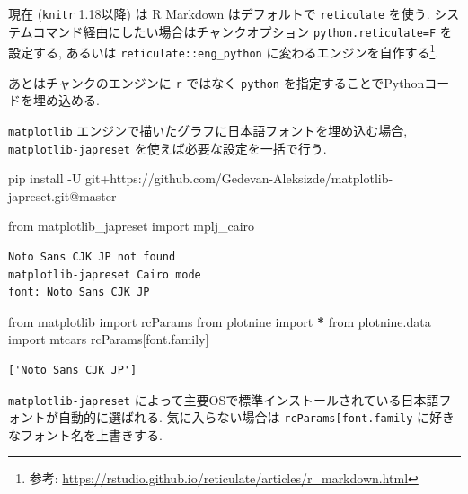 \documentclass[
  xelatex,ja=standard,jafont=noto]{bxjsbook}
\newenvironment{Shaded}{\begin{snugshade}}{\end{snugshade}}
\newcommand{\AttributeTok}[1]{\textcolor[rgb]{0.77,0.63,0.00}{#1}}
\newcommand{\ExtensionTok}[1]{#1}
\newcommand{\ImportTok}[1]{#1}
\newcommand{\NormalTok}[1]{#1}
\newcommand{\OperatorTok}[1]{\textcolor[rgb]{0.81,0.36,0.00}{\textbf{#1}}}
\newcommand{\StringTok}[1]{\textcolor[rgb]{0.31,0.60,0.02}{#1}}
\theoremstyle{definition}
\theoremstyle{definition}
\theoremstyle{definition}
\theoremstyle{definition}
\theoremstyle{remark}
\begin{document}
現在 (\texttt{knitr} 1.18以降) は R Markdown はデフォルトで
\texttt{reticulate} を使う.
システムコマンド経由にしたい場合はチャンクオプション
\texttt{python.reticulate=F} を設定する, あるいは
\texttt{reticulate::eng\_python} に変わるエンジンを自作する\footnote{参考:
  \url{https://rstudio.github.io/reticulate/articles/r_markdown.html}}.

あとはチャンクのエンジンに \texttt{r} ではなく \texttt{python}
を指定することでPythonコードを埋め込める.

\texttt{matplotlib}
エンジンで描いたグラフに日本語フォントを埋め込む場合,
\texttt{matplotlib-japreset} を使えば必要な設定を一括で行う.

\begin{Shaded}
\begin{Highlighting}[]
\ExtensionTok{pip}\NormalTok{ install }\AttributeTok{{-}U}\NormalTok{ git+https://github.com/Gedevan{-}Aleksizde/matplotlib{-}japreset.git@master}
\end{Highlighting}
\end{Shaded}

\begin{Shaded}
\begin{Highlighting}[numbers=left,,]
\ImportTok{from}\NormalTok{ matplotlib\_japreset }\ImportTok{import}\NormalTok{ mplj\_cairo}
\end{Highlighting}
\end{Shaded}

\begin{verbatim}
Noto Sans CJK JP not found
matplotlib-japreset Cairo mode
font: Noto Sans CJK JP
\end{verbatim}

\begin{Shaded}
\begin{Highlighting}[numbers=left,,]
\ImportTok{from}\NormalTok{ matplotlib }\ImportTok{import}\NormalTok{ rcParams}
\ImportTok{from}\NormalTok{ plotnine }\ImportTok{import} \OperatorTok{*}
\ImportTok{from}\NormalTok{ plotnine.data }\ImportTok{import}\NormalTok{ mtcars}
\NormalTok{rcParams[}\StringTok{\textquotesingle{}font.family\textquotesingle{}}\NormalTok{]}
\end{Highlighting}
\end{Shaded}

\begin{verbatim}
['Noto Sans CJK JP']
\end{verbatim}

\texttt{matplotlib-japreset}
によって主要OSで標準インストールされている日本語フォントが自動的に選ばれる.
気に入らない場合は
\texttt{rcParams{[}\textquotesingle{}font.family\textquotesingle{}{]}}
に好きなフォント名を上書きする.
\end{document}
